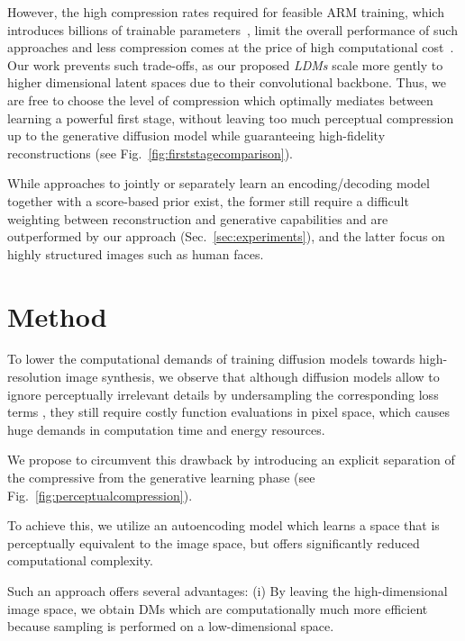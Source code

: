 However, the high compression rates required for feasible ARM training, which introduces billions of trainable parameters~\cite{DBLP:journals/corr/abs-2102-12092,DBLP:journals/corr/abs-2012-09841}, limit the overall performance of such approaches and less compression comes at the price of high computational cost~\cite{DBLP:journals/corr/abs-2102-12092,DBLP:journals/corr/abs-2012-09841}. Our work prevents such trade-offs, as our proposed \emph{LDMs} scale more gently to higher dimensional latent spaces due to their convolutional backbone. Thus, we are free to choose the level of compression which optimally mediates between learning a powerful first stage, without leaving too much perceptual compression up to the generative diffusion model while guaranteeing high-fidelity reconstructions (see Fig.~\ref{fig:firststagecomparison}).

While approaches to jointly \cite{DBLP:journals/corr/abs-2106-05931} or separately \cite{DBLP:journals/corr/abs-2106-06819} learn an encoding/decoding model together with a score-based prior exist, the former still require a difficult weighting between reconstruction and generative capabilities \cite{DBLP:conf/iclr/DaiW19} and are outperformed by our approach (Sec.~\ref{sec:experiments}), and the latter focus on highly structured images such as human faces.

\section{Method}
\enlargethispage{\baselineskip}
\label{sec:method}

To lower the computational demands of training diffusion models towards high-resolution image synthesis, we observe that although diffusion models allow to ignore perceptually irrelevant details by undersampling the corresponding loss terms \cite{DBLP:conf/nips/HoJA20}, they still require costly function evaluations in pixel space, which causes huge demands in computation time and energy resources. 

We propose to circumvent this drawback by introducing an explicit separation of the compressive from the generative learning phase (see
 Fig.~\ref{fig:perceptualcompression}).

 To achieve this, we utilize an autoencoding model which learns a space that is perceptually equivalent to the image space, but offers significantly reduced computational complexity.

Such an approach offers several advantages: (i) By leaving the high-dimensional image space, we obtain DMs which are computationally much more efficient because sampling is performed on a low-dimensional space.


